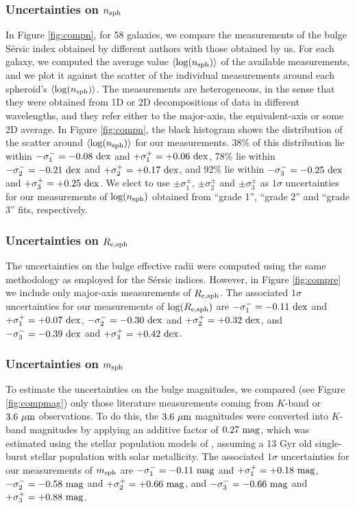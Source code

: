 \documentclass[preprint2]{emulateapj}
\begin{document}
\subsubsection{Uncertainties on $n_{\rm sph}$}
In Figure \ref{fig:compn}, for 58 galaxies, 
we compare the measurements of the bulge S\'ersic index obtained by different authors 
with those obtained by us. 
For each galaxy, we computed the average value $\langle \log(n_{\rm sph}) \rangle$ of the available measurements, 
and we plot it against the scatter of the individual measurements around each spheroid's $\langle \log(n_{\rm sph}) \rangle$.
The measurements are heterogeneous, 
in the sense that they were obtained from 1D or 2D decompositions of data in different wavelengths, 
and they refer either to the major-axis, the equivalent-axis or some 2D average.
In Figure \ref{fig:compn}, the black histogram shows the distribution of the scatter around $\langle \log(n_{\rm sph}) \rangle$ 
for our measurements. 
38\% of this distribution lie within $-\sigma_1^- = -0.08~\rm dex$ and $+\sigma_1^+ = +0.06~\rm dex$, 
78\% lie within $-\sigma_2^- = -0.21~\rm dex$ and $+\sigma_2^+ = +0.17~\rm dex$,
and 92\% lie within $-\sigma_3^- = -0.25~\rm dex$ and $+\sigma_3^+ = +0.25~\rm dex$. 
We elect to use $\pm \sigma_1^\pm$, $\pm \sigma_2^\pm$ and $\pm \sigma_3^\pm$ as $1\sigma$ uncertainties 
for our measurements of $\log(n_{\rm sph})$ obtained from ``grade 1'', ``grade 2'' and ``grade 3'' fits, respectively. \\

\subsubsection{Uncertainties on $R_{\rm e,sph}$}
The uncertainties on the bulge effective radii were computed using the same methodology as employed for the S\'ersic indices. 
However, in Figure \ref{fig:compre} we include only major-axis measurements of $R_{\rm e,sph}$. 
The associated $1\sigma$ uncertainties for our measurements of $\log(R_{\rm e,sph})$ are 
$-\sigma_1^- = -0.11~\rm dex$ and $+\sigma_1^+ = +0.07~\rm dex$, 
$-\sigma_2^- = -0.30~\rm dex$ and $+\sigma_2^+ = +0.32~\rm dex$,
and $-\sigma_3^- = -0.39~\rm dex$ and $+\sigma_3^+ = +0.42~\rm dex$. 

\subsubsection{Uncertainties on $m_{\rm sph}$}
To estimate the uncertainties on the bulge magnitudes, 
we compared (see Figure \ref{fig:compmag}) only those literature measurements coming from $K$-band or $3.6~\rm \mu m$ observations.
To do this, the $3.6~\rm \mu m$ magnitudes were converted into $K$-band magnitudes by applying an additive factor of $0.27\rm~mag$, 
which was estimated using the stellar population models of \cite{worthey1994},
assuming a 13 Gyr old single-burst stellar population with solar metallicity. 
The associated $1\sigma$ uncertainties for our measurements of $m_{\rm sph}$ are 
$-\sigma_1^- = -0.11~\rm mag$ and $+\sigma_1^+ = +0.18~\rm mag$, 
$-\sigma_2^- = -0.58~\rm mag$ and $+\sigma_2^+ = +0.66~\rm mag$,
and $-\sigma_3^- = -0.66~\rm mag$ and $+\sigma_3^+ = +0.88~\rm mag$. 
\end{document}
